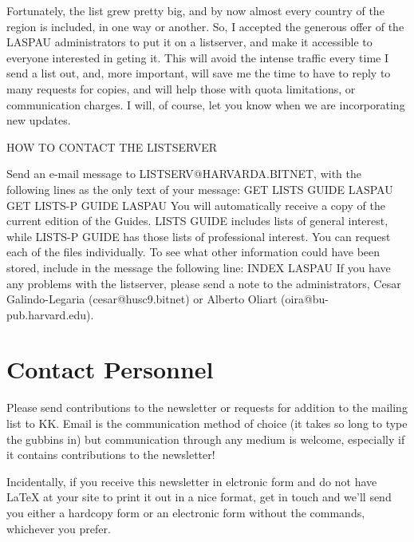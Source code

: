 Fortunately, the list grew pretty big, and by now almost every country
of the region is included, in one way or another. So, I accepted
the generous offer of the LASPAU administrators to put it on a
listserver, and make it accessible to everyone interested in geting
it. This will avoid the intense traffic every time I send a list out,
and, more important, will save me the time to have to reply to
many requests for copies, and will help those with quota limitations,
or communication charges. I will, of course, let you know when we are
incorporating new updates.


                    HOW TO CONTACT THE LISTSERVER

Send an e-mail message to LISTSERV@HARVARDA.BITNET, with the following
lines as the only text of your message:
GET LISTS   GUIDE LASPAU
GET LISTS-P GUIDE LASPAU
You will automatically receive a copy of the current edition of the Guides.
LISTS GUIDE includes lists of general interest, while LISTS-P GUIDE has
those lists of professional interest.  You can request each of the files
individually.
To see what other information could have been stored, include in the
message the following line:
INDEX LASPAU
If you have any problems with the listserver, please send a note to
the administrators, Cesar Galindo-Legaria (cesar@husc9.bitnet) or
Alberto Oliart (oira@bu-pub.harvard.edu).

\pagebreak
\section{Contact Personnel}
Please send contributions to the newsletter or requests for addition
to the mailing list to KK. Email is the communication method of choice
(it takes so long to type the gubbins in) but communication through any
medium is welcome, especially if it contains contributions to the
newsletter!

Incidentally, if you receive this newsletter in elctronic form and do
not have LaTeX at your site to print it out in a nice format, get in
touch and we'll send you either a hardcopy form or an electronic form
without the commands, whichever you prefer.

